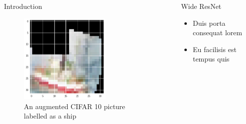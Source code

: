 \documentclass[final]{beamer}
\newlength{\sepwid}
\newlength{\onecolwid}
\newlength{\twocolwid}
\begin{document}
\begin{frame}[t]
\begin{columns}[t]
\begin{column}{\onecolwid}
\begin{block}{Introduction}
\begin{figure}
\centering
\includegraphics[width=0.70\textwidth]{ship.png}
\caption{An augmented CIFAR 10 picture labelled as a ship}
\end{figure}

\end{block}
\end{column} %

\begin{column}{\sepwid}\end{column} %
\begin{column}{\twocolwid} %
\begin{columns}[t,totalwidth=\twocolwid] %

\begin{column}{\onecolwid}\vspace{-.6in} %


\begin{block}{Wide ResNet}
\cite{Zagoruyko2016}
\begin{itemize}
\item Duis porta consequat lorem
\item Eu facilisis est tempus quis
\end{itemize}

\end{block}



\end{column}
\end{columns}
\end{column}
\end{columns}
\end{frame}
\end{document}
